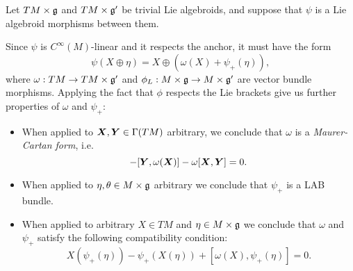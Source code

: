 \begin{example}\label{exampleLieAlgebroidMorphismsBetweenTrivialLieAlgebroids}
Let $TM \times \mathfrak{g}$ and $TM \times \mathfrak{g}'$ be trivial Lie algebroids, and suppose that $\psi$ is a Lie algebroid morphisms between them.

Since $\psi$ is $C^\infty(M)$-linear and it respects the anchor, it must have the form
\begin{equation}\label{equationFormOFGeneralMorphismTrivialLieAlgebroidsBetween}
    \psi(X \oplus \eta) = X \oplus (\omega(X) + \psi_+(\eta)),
\end{equation}
where $\omega: TM \to TM \times \mathfrak{g}'$ and $\phi_L: M \times \alg g \to M \times \alg g'$ are vector bundle morphisms.
Applying the fact that $\phi$ respects the Lie brackets give us further properties of $\omega$ and $\psi_+$:
\begin{itemize}
    
    \item When applied to $\bm{X}, \bm{Y} \in \Gamma(TM)$ arbitrary, we conclude that $\omega$ is a \textit{Maurer-Cartan form}, i.e. 
        \begin{equation}
            [\sect X, \omega(\sect Y)] - [\sect Y , \omega(\sect X)] - \omega[\sect X, \sect Y] = 0.
        \end{equation}
    
    \item When applied to $\eta, \theta \in M \times \mathfrak{g}$ arbitrary we conclude that $\psi_+$ is a LAB bundle.
    
    \item When applied to arbitrary $X \in TM$ and $\eta \in M \times \mathfrak{g}$ we conclude that $\omega$ and $\psi_+$ satisfy the following compatibility condition:
    \begin{equation}
        X(\psi_+(\eta)) - \psi_+(X(\eta)) + [\omega(X), \psi_+(\eta)] = 0.
    \end{equation}
    
\end{itemize}

\end{example}

